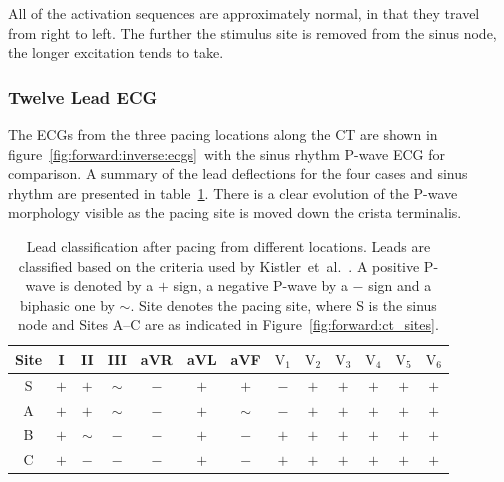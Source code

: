 All of the activation sequences are approximately normal, in that they travel
from right to left.
The further the stimulus site is removed from the sinus node, the longer
excitation tends to take.


\subsubsection{Twelve Lead ECG}

The ECGs from the three pacing locations along the CT are shown in
figure~\ref{fig:forward:inverse:ecgs}\ with the sinus rhythm P-wave ECG for
comparison.
A summary of the lead deflections for the four cases and sinus rhythm are
presented in table~\ref{tbl:forward:inverse:ecgs}.
There is a clear evolution of the P-wave morphology visible as the pacing site
is moved down the crista terminalis.

\begin{table}
\caption[Lead classification under pacing from different locations]{
\label{tbl:forward:inverse:ecgs}
Lead classification after pacing from different locations.
Leads are classified based on the criteria used by
Kistler~et~al.~\cite{Kistler2006}.
A positive P-wave is denoted by a $+$ sign, a negative P-wave by a $-$ sign and
a biphasic one by $\sim$.
Site denotes the pacing site, where S is the sinus node and Sites A--C are as
indicated in Figure~\ref{fig:forward:ct_sites}.
}
\begin{center}
\begin{tabular}{c c c c c c c c c c c c c}
\toprule
Site & I & II & III & aVR & aVL & aVF & $\text{V}_{\text{1}}$ &$\text{V}_{\text{2}}$ & $\text{V}_{\text{3}}$ & $\text{V}_{\text{4}}$ & $\text{V}_{\text{5}}$ & $\text{V}_{\text{6}}$\\
\midrule
S   & $+$ & $+$ & $\sim$ & $-$ & $+$ & $+$ & $-$ & $+$ & $+$ & $+$ & $+$ & $+$ \\
A   & $+$ & $+$ & $\sim$ & $-$ & $+$ & $\sim$ & $-$ & $+$ & $+$ & $+$ & $+$ & $+$ \\
B   & $+$ & $\sim$ & $-$ & $-$ & $+$ & $-$ & $+$ & $+$ & $+$ & $+$ & $+$ & $+$ \\
C   & $+$ & $-$ & $-$ & $-$ & $+$ & $-$ & $+$ & $+$ & $+$ & $+$ & $+$ & $+$ \\
\bottomrule
\end{tabular}
\end{center}
\end{table}

